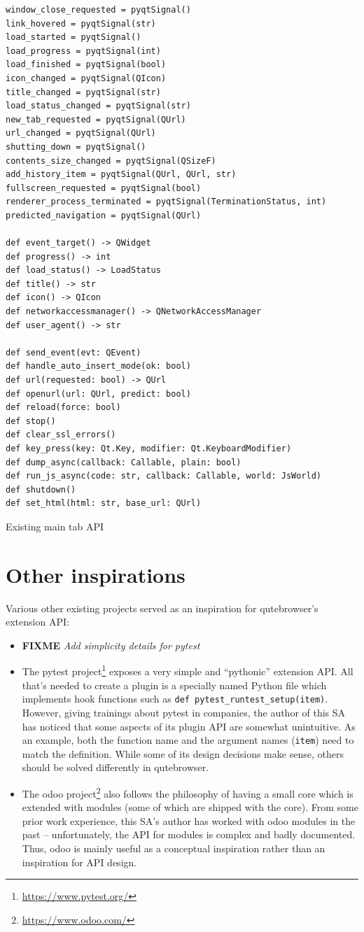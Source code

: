 \documentclass[a4paper,parskip=full]{scrreprt}
\newcommand{\py}[1]{\texttt{#1}}
\newcommand{\fixme}[1]{\textbf{FIXME} \emph{#1}}
\begin{document}
\begin{listing}
\begin{verbatim}
window_close_requested = pyqtSignal()
link_hovered = pyqtSignal(str)
load_started = pyqtSignal()
load_progress = pyqtSignal(int)
load_finished = pyqtSignal(bool)
icon_changed = pyqtSignal(QIcon)
title_changed = pyqtSignal(str)
load_status_changed = pyqtSignal(str)
new_tab_requested = pyqtSignal(QUrl)
url_changed = pyqtSignal(QUrl)
shutting_down = pyqtSignal()
contents_size_changed = pyqtSignal(QSizeF)
add_history_item = pyqtSignal(QUrl, QUrl, str)
fullscreen_requested = pyqtSignal(bool)
renderer_process_terminated = pyqtSignal(TerminationStatus, int)
predicted_navigation = pyqtSignal(QUrl)

def event_target() -> QWidget
def progress() -> int
def load_status() -> LoadStatus
def title() -> str
def icon() -> QIcon
def networkaccessmanager() -> QNetworkAccessManager
def user_agent() -> str

def send_event(evt: QEvent)
def handle_auto_insert_mode(ok: bool)
def url(requested: bool) -> QUrl
def openurl(url: QUrl, predict: bool)
def reload(force: bool)
def stop()
def clear_ssl_errors()
def key_press(key: Qt.Key, modifier: Qt.KeyboardModifier)
def dump_async(callback: Callable, plain: bool)
def run_js_async(code: str, callback: Callable, world: JsWorld)
def shutdown()
def set_html(html: str, base_url: QUrl)
\end{verbatim}
  \caption{Existing main tab API}
  \label{lst:tabapi}
\end{listing}

\section{Other inspirations}
Various other existing projects served as an inspiration for qutebrowser's
extension API:

\begin{itemize}
  \item \fixme{Add simplicity details for pytest}
  \item The pytest project\footnote{\url{https://www.pytest.org/}} exposes a
    very simple and ``pythonic'' extension API. All that's needed to create a
    plugin is a specially named Python file which implements hook functions such
    as \py{def pytest_runtest_setup(item)}. However, giving trainings about
    pytest in companies, the author of this SA has noticed that some aspects of
    its plugin API are somewhat unintuitive. As an example, both the function
    name and the argument names (\verb|item|) need to match the definition.
    While some of its design decisions make sense, others should be solved
    differently in qutebrowser.
  \item The odoo project\footnote{\url{https://www.odoo.com/}} also follows the
    philosophy of having a small core which is extended with modules (some of
    which are shipped with the core). From some prior work experience, this SA's
    author has worked with odoo modules in the past -- unfortunately, the API
    for modules is complex and badly documented. Thus, odoo is mainly useful as
    a conceptual inspiration rather than an inspiration for API design.
\end{itemize}
\end{document}
